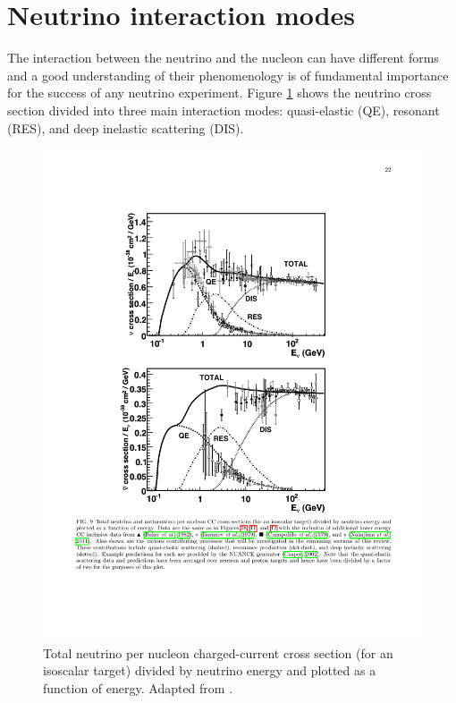 \section{Neutrino interaction modes}\label{sec:modes}
The interaction between the neutrino and the nucleon can have different forms and a good understanding of their phenomenology is of fundamental importance for the success of any neutrino experiment.
Figure \ref{fig:ccqecross} shows the neutrino cross section divided into three main interaction modes: quasi-elastic (QE), resonant (RES), and deep inelastic scattering (DIS). 

\begin{figure}[htbp]
    \centering
    \includegraphics[width=0.7\linewidth]{figures/ccqecross.pdf}
    \caption{Total neutrino per nucleon charged-current cross section (for an isoscalar target) divided by neutrino energy and plotted as a function of energy. Adapted from \cite{Formaggio:2013kya}.}
    \label{fig:ccqecross}
\end{figure}

